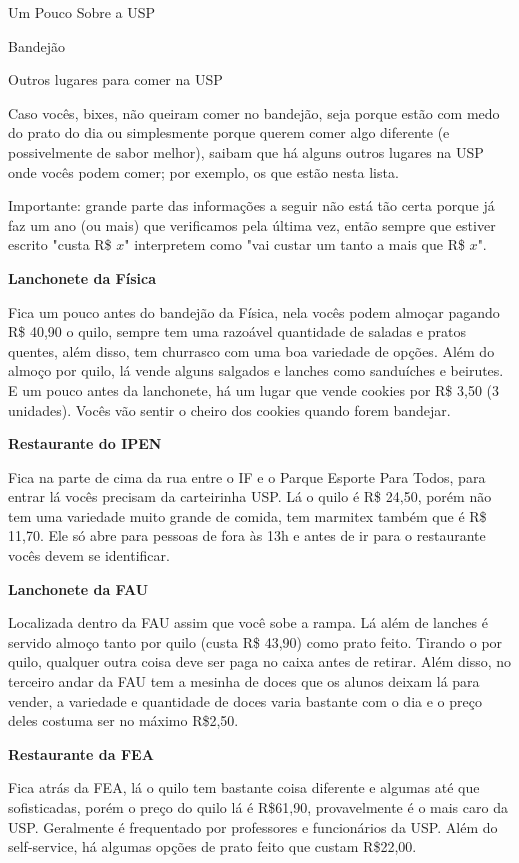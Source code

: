 \begin{secao}{Um Pouco Sobre a USP}
\begin{subsecao}{Bandejão}
\end{subsecao}

\begin{subsecao}{Outros lugares para comer na USP}

Caso vocês, bixes, não queiram comer no bandejão, seja porque estão com medo do
prato do dia ou simplesmente porque querem comer algo diferente (e
possivelmente de sabor melhor), saibam que há alguns outros lugares na USP onde
vocês podem comer; por exemplo, os que estão nesta lista.

Importante: grande parte das informações a seguir não está tão certa porque já
faz um ano (ou mais) que verificamos pela última vez, então sempre que estiver
escrito "custa R\$ $x$" interpretem como "vai custar um tanto a mais que R\$ $x$".

{\bf Lanchonete da Física}

Fica um pouco antes do bandejão da Física, nela vocês podem almoçar pagando R\$
40,90 o quilo, sempre tem uma razoável quantidade de saladas e pratos
quentes, além disso, tem churrasco com uma boa variedade de opções.
Além do almoço por quilo, lá vende alguns salgados e lanches como sanduíches e
beirutes. E um pouco antes da lanchonete, há um lugar que vende cookies por R\$
3,50 (3 unidades). Vocês vão sentir o cheiro dos cookies quando forem bandejar.

{\bf Restaurante do IPEN}

Fica na parte de cima da rua entre o IF e o Parque Esporte Para Todos, para
entrar lá vocês precisam da carteirinha USP. Lá o quilo é R\$ 24,50, porém não
tem uma variedade muito grande de comida, tem marmitex também que é R\$ 11,70.
Ele só abre para pessoas de fora às 13h e antes de ir para o restaurante vocês
devem se identificar.

{\bf Lanchonete da FAU}

Localizada dentro da FAU assim que você sobe a rampa. Lá além de lanches é
servido almoço tanto por quilo (custa R\$ 43,90) como prato feito. Tirando o por
quilo, qualquer outra coisa deve ser paga no caixa antes de retirar. Além
disso, no terceiro andar da FAU tem a mesinha de doces que os alunos deixam lá
para vender, a variedade e quantidade de doces varia bastante com o dia e o
preço deles costuma ser no máximo R\$2,50.

{\bf Restaurante da FEA}

Fica atrás da FEA, lá o quilo tem bastante coisa diferente e algumas até que
sofisticadas, porém o preço do quilo lá é R\$61,90, provavelmente é o mais caro
da USP. Geralmente é frequentado por professores e funcionários da USP. Além do
self-service, há algumas opções de prato feito que custam R\$22,00.
\pagebreak


\end{subsecao}
\end{secao}
